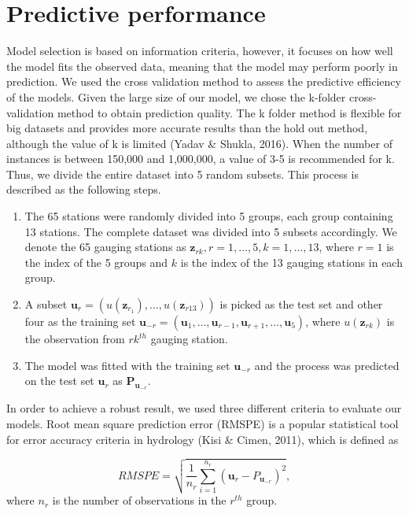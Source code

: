 \documentclass[12pt,oneside]{reedthesis}
\begin{document}
\hypertarget{predictive-performance}{%
\section{Predictive performance}\label{predictive-performance}}

Model selection is based on information criteria, however, it focuses on how well the model fits the observed data, meaning that the model may perform poorly in prediction. We used the cross validation method to assess the predictive efficiency of the models. Given the large size of our model, we chose the k-folder cross-validation method to obtain prediction quality. The k folder method is flexible for big datasets and provides more accurate results than the hold out method, although the value of k is limited (Yadav \& Shukla, 2016). When the number of instances is between 150,000 and 1,000,000, a value of 3-5 is recommended for k. Thus, we divide the entire dataset into 5 random subsets. This process is described as the following steps.
\begin{enumerate}
\def\labelenumi{\arabic{enumi}.}
\item
  The 65 stations were randomly divided into 5 groups, each group containing 13 stations. The complete dataset was divided into 5 subsets accordingly. We denote the 65 gauging stations as \(\pmb{z}_{rk},r=1,\dots,5,k=1,\dots,13\), where \(r=1\) is the index of the 5 groups and \(k\) is the index of the 13 gauging stations in each group.
\item
  A subset \(\pmb{u}_r=(u(\pmb{z}_{r_1}),\dots,u(\pmb{z}_{r13}))\) is picked as the test set and other four as the training set \(\pmb{u}_{-r}=(\pmb{u}_1,\dots,\pmb{u}_{r-1},\pmb{u}_{r+1},\dots,\pmb{u}_5)\), where \(u(\pmb{z}_{rk})\) is the observation from \(rk^{th}\) gauging station.
\item
  The model was fitted with the training set \(\pmb{u}_{-r}\) and the process was predicted on the test set \(\pmb{u}_{r}\) as \(\pmb{P}_{\pmb{u}_{-r}}\).
\end{enumerate}
In order to achieve a robust result, we used three different criteria to evaluate our models. Root mean square prediction error (RMSPE) is a popular statistical tool for error accuracy criteria in hydrology (Kisi \& Cimen, 2011), which is defined as

\[RMSPE=\sqrt{\frac{1}{n_r}\sum_{i=1}^{n_r}(\pmb{u}_{r}-P_{\pmb{u}_{-r}})^2},\] where \(n_r\) is the number of observations in the \(r^{th}\) group.
\end{document}
